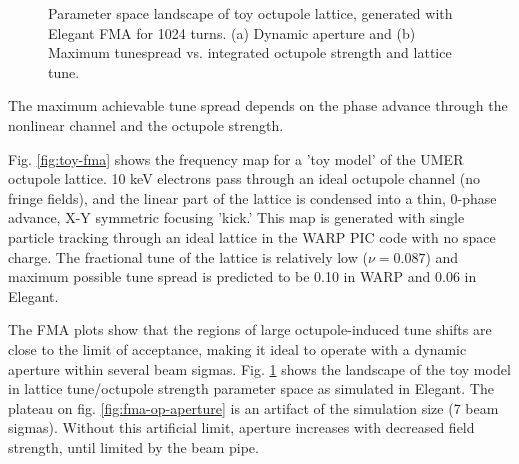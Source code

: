\begin{figure}[]
\centering
{}\hspace{.25in}
\caption{Parameter space landscape of toy octupole lattice, generated with Elegant FMA for 1024 turns. (a) Dynamic aperture and (b) Maximum tunespread vs. integrated octupole strength and lattice tune.}
\label{fig:fma-op}
\end{figure}



The maximum achievable tune spread depends on the phase advance through the nonlinear channel and the octupole strength.
 

Fig. \ref{fig:toy-fma} shows the frequency map for a 'toy model' of the UMER octupole lattice. 10 keV electrons pass through an ideal octupole channel (no fringe fields), and the linear part of the lattice is condensed into a thin, 0-phase advance, X-Y symmetric focusing 'kick.'
This map is generated with single particle tracking through an ideal lattice in the WARP PIC code \cite{warp} with no space charge. 
The fractional tune of the lattice is relatively low ($\nu = 0.087$) and maximum possible tune spread is predicted to be 0.10 in WARP and 0.06 in Elegant. 



The FMA plots show that the regions of large octupole-induced tune shifts are close to the limit of acceptance, making it ideal to operate with a dynamic aperture within several beam sigmas. 
Fig. \ref{fig:fma-op} shows the landscape of the toy model in lattice tune/octupole strength parameter space as simulated in Elegant. 
The plateau on fig. \ref{fig:fma-op-aperture} is an artifact of the simulation size (7 beam sigmas). Without this artificial limit, aperture increases with decreased field strength, until limited by the beam pipe.

